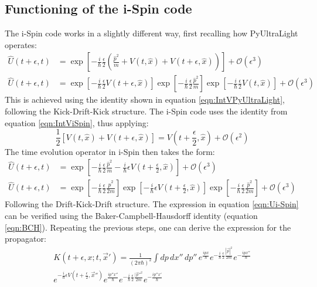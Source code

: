 \documentclass[12pt]{article}
\begin{document}
\subsection*{Functioning of the i-Spin code}
The i-Spin code works in a slightly different way, first recalling how PyUltraLight\cite{edwards2018pyultralight} operates:
\begin{align}
    \hat{U}(t+\epsilon,t)&=\exp \left[-\frac{i}{\hbar}\frac{\epsilon}{2}\left(\frac{\hat{p}^2}{m}+V(t,\hat{x})+V(t+\epsilon,\hat{x}) \right) \right] +\mathcal{O}(\epsilon^3) \\
    \hat{U}(t+\epsilon,t)&=\exp \left[-\frac{i}{\hbar}\frac{\epsilon}{2}V(t+\epsilon,\hat{x}) \right] \exp \left[-\frac{i}{\hbar}\frac{\epsilon}{2}\frac{\hat{p}^2}{m} \right] \exp \left[-\frac{i}{\hbar}\frac{\epsilon}{2}V(t,\hat{x}) \right]+\mathcal{O}(\epsilon^3)
\end{align}
This is achieved using the identity shown in equation \ref{eqn:IntVPyUltraLight}, following the Kick-Drift-Kick structure. The i-Spin\cite{jain2023spin} code uses the identity from equation \ref{eqn:IntViSpin}, thus applying:
\begin{equation}
    \frac{1}{2}\left[V(t,\hat{x})+V(t+\epsilon,\hat{x}) \right]=V\left(t+\frac{\epsilon}{2},\hat{x}\right)+\mathcal{O}(\epsilon^2)
\end{equation}
The time evolution operator in i-Spin then takes the form:
\begin{align}
    \hat{U}(t+\epsilon,t)&=\exp\left[-\frac{i}{\hbar}\frac{\epsilon}{2}\frac{\hat{p}^2}{m}-\frac{i}{\hbar}\epsilon V\left(t+\frac{\epsilon}{2},\hat{x} \right) \right]+\mathcal{O}(\epsilon^3) \\
    \hat{U}(t+\epsilon,t)&=\exp \left[-\frac{i}{\hbar}\frac{\epsilon}{2}\frac{\hat{p}^2}{2m} \right] \exp \left[ -\frac{i}{\hbar}\epsilon V\left( t+\frac{\epsilon}{2},\hat{x}\right)\right]\exp \left[-\frac{i}{\hbar}\frac{\epsilon}{2}\frac{\hat{p}^2}{2m} \right]+\mathcal{O}(\epsilon^3) \label{eqn:Ui-Spin}
\end{align}
Following the Drift-Kick-Drift structure. The expression in equation \ref{eqn:Ui-Spin} can be verified using the Baker-Campbell-Hausdorff identity (equation \ref{eqn:BCH}). Repeating the previous steps, one can derive the expression for the propagator:
\begin{multline}
 K(t+\epsilon,x;t,\vec{x}')=\frac{1}{(2\pi\hbar)^2}\int dp\,dx''\,dp''\, e^{\frac{ipx}{\hbar}}e^{-\frac{i}{\hbar}\frac{\epsilon}{2}\frac{|\vec{p}|^2}{2m}}e^{-\frac{ipx''}{\hbar}} \\ e^{-\frac{i}{\hbar}\epsilon V\left(t+\frac{\epsilon}{2},\vec{x}''\right)}e^{\frac{ip''x''}{\hbar}}e^{-\frac{i}{\hbar}\frac{\epsilon}{2}\frac{|\vec{p}''^2}{2m}}e^{-\frac{ip''x'}{\hbar}}
\end{multline}
\end{document}
